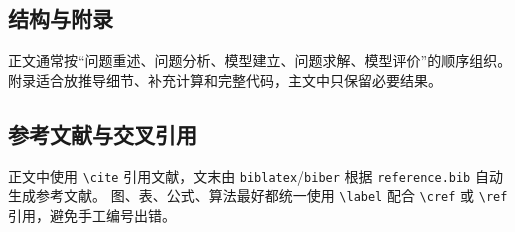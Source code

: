 \subsection{结构与附录}
正文通常按“问题重述、问题分析、模型建立、问题求解、模型评价”的顺序组织。
附录适合放推导细节、补充计算和完整代码，主文中只保留必要结果。

\subsection{参考文献与交叉引用}
正文中使用 \texttt{\textbackslash cite} 引用文献，文末由 \texttt{biblatex}/\texttt{biber} 根据 \texttt{reference.bib} 自动生成参考文献\cite{nan2017fast}。
图、表、公式、算法最好都统一使用 \texttt{\textbackslash label} 配合 \texttt{\textbackslash cref} 或 \texttt{\textbackslash ref} 引用，避免手工编号出错。
